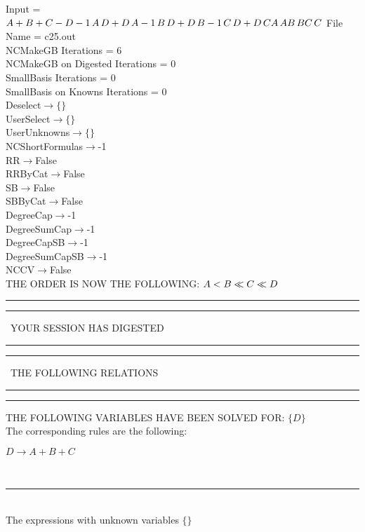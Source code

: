 \documentclass[rep10,leqno]{report}
\begin{document}
\normalsize
\baselineskip=12pt
\noindent
Input = 
$
\\A + B + C - D\\
-1\,
 A\,
 D + D\,
 A\\
-1\,
 B\,
 D + D\,
 B\\
-1\,
 C\,
 D + D\,
 C\\
A\,
 A\\
B\,
 B\\
C\,
 C\\
$
File Name = c25.out\\
NCMakeGB Iterations = 6\\
NCMakeGB on Digested Iterations = 0\\
SmallBasis Iterations = 0\\
SmallBasis on Knowns Iterations = 0\\
Deselect$\rightarrow \{\}$\\
UserSelect$\rightarrow \{\}$\\
UserUnknowns$\rightarrow \{\}$\\
NCShortFormulas$\rightarrow$-1\\
RR$\rightarrow $False\\
RRByCat$\rightarrow $False\\
SB$\rightarrow $False\\
SBByCat$\rightarrow $False\\
DegreeCap$\rightarrow $-1\\
DegreeSumCap$\rightarrow $-1\\
DegreeCapSB$\rightarrow $-1\\
DegreeSumCapSB$\rightarrow $-1\\
NCCV$\rightarrow $False\\
THE ORDER IS NOW THE FOLLOWING:\hfil\break
$
A<B\ll
C\ll
D\\
$
\rule[2pt]{6in}{4pt}\hfil\break
\rule[2pt]{1.879in}{4pt}
\ YOUR SESSION HAS DIGESTED\ 
\rule[2pt]{1.879in}{4pt}\hfil\break
\rule[2pt]{1.923in}{4pt}
\ THE FOLLOWING RELATIONS\ 
\rule[2pt]{1.923in}{4pt}\hfil\break
\rule[2pt]{6in}{4pt}\hfil\break
THE FOLLOWING VARIABLES HAVE BEEN SOLVED FOR:\hfil\break
$\{D\}$
\smallskip\\
The corresponding rules are the following:\smallskip\\
\begin{minipage}{6in}
$
D\rightarrow A + B + C
$
\end{minipage}\medskip\\
\rule[3pt]{6in}{.7pt}\\
The expressions with unknown variables $\{\}$\\
\end{document}
